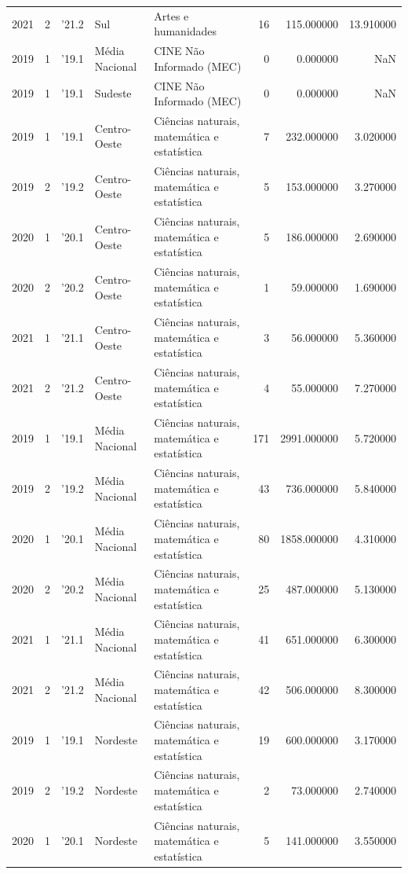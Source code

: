 \begin{longtable}{rrlllrrr}
2021 & 2 & '21.2 & Sul & Artes e humanidades & 16 & 115.000000 & 13.910000 \\
2019 & 1 & '19.1 & Média Nacional & CINE Não Informado (MEC) & 0 & 0.000000 & NaN \\
2019 & 1 & '19.1 & Sudeste & CINE Não Informado (MEC) & 0 & 0.000000 & NaN \\
2019 & 1 & '19.1 & Centro-Oeste & Ciências naturais, matemática e estatística & 7 & 232.000000 & 3.020000 \\
2019 & 2 & '19.2 & Centro-Oeste & Ciências naturais, matemática e estatística & 5 & 153.000000 & 3.270000 \\
2020 & 1 & '20.1 & Centro-Oeste & Ciências naturais, matemática e estatística & 5 & 186.000000 & 2.690000 \\
2020 & 2 & '20.2 & Centro-Oeste & Ciências naturais, matemática e estatística & 1 & 59.000000 & 1.690000 \\
2021 & 1 & '21.1 & Centro-Oeste & Ciências naturais, matemática e estatística & 3 & 56.000000 & 5.360000 \\
2021 & 2 & '21.2 & Centro-Oeste & Ciências naturais, matemática e estatística & 4 & 55.000000 & 7.270000 \\
2019 & 1 & '19.1 & Média Nacional & Ciências naturais, matemática e estatística & 171 & 2991.000000 & 5.720000 \\
2019 & 2 & '19.2 & Média Nacional & Ciências naturais, matemática e estatística & 43 & 736.000000 & 5.840000 \\
2020 & 1 & '20.1 & Média Nacional & Ciências naturais, matemática e estatística & 80 & 1858.000000 & 4.310000 \\
2020 & 2 & '20.2 & Média Nacional & Ciências naturais, matemática e estatística & 25 & 487.000000 & 5.130000 \\
2021 & 1 & '21.1 & Média Nacional & Ciências naturais, matemática e estatística & 41 & 651.000000 & 6.300000 \\
2021 & 2 & '21.2 & Média Nacional & Ciências naturais, matemática e estatística & 42 & 506.000000 & 8.300000 \\
2019 & 1 & '19.1 & Nordeste & Ciências naturais, matemática e estatística & 19 & 600.000000 & 3.170000 \\
2019 & 2 & '19.2 & Nordeste & Ciências naturais, matemática e estatística & 2 & 73.000000 & 2.740000 \\
2020 & 1 & '20.1 & Nordeste & Ciências naturais, matemática e estatística & 5 & 141.000000 & 3.550000 \\

\end{longtable}
